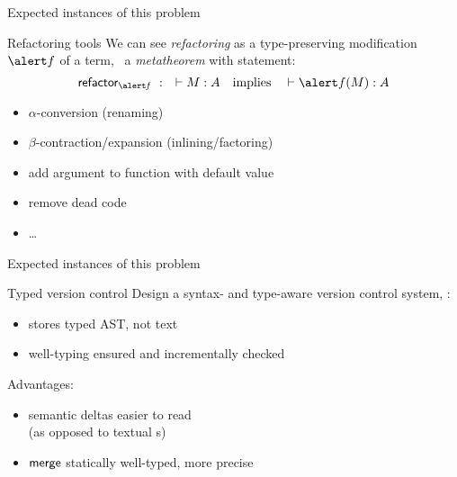 \documentclass{beamer}
\theoremstyle{example}
\begin{document}
\begin{frame}{Expected instances of this problem}
  \begin{block}{Refactoring tools}
    We can see \emph{refactoring} as a type-preserving modification
    $\alert f$ of a term, \ie\ a \emph{metatheorem} with statement:
    $$ \funname{refactor_{\mathit{\alert f}}}\ :\quad \vdash M : A \quad\text{implies}\quad \vdash \alert f(M) : A $$
  \end{block}
  \begin{examples}
    \begin{itemize}
    \item $\alpha$-conversion (renaming)
    \item $\beta$-contraction/expansion (inlining/factoring)
    \item add argument to function with default value
    \item remove dead code
    \item \ldots
    \end{itemize}
  \end{examples}
\end{frame}

\begin{frame}{Expected instances of this problem}
  \begin{block}{Typed version control}
    Design a syntax- and type-aware version control system, \ie:

    \begin{itemize}
    \item stores typed AST, not text
    \item well-typing ensured and incrementally checked
    \end{itemize}

    Advantages:
    \begin{itemize}
    \item semantic deltas easier to read\\
      {\small (as opposed to textual s)}
    \item ${\rm\mathsf{merge}}$ statically well-typed, more precise
    \end{itemize}
  \end{block}
\end{frame}
\end{document}
